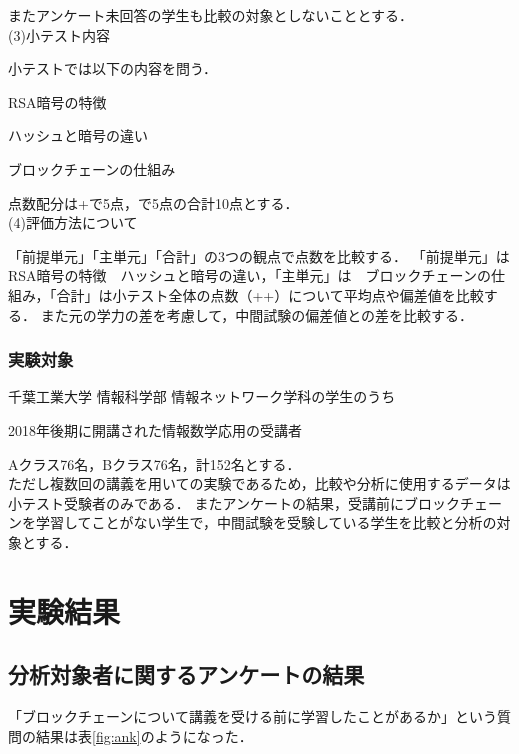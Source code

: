 \documentclass[a4j,12pt]{jsarticle}
\begin{document}
またアンケート未回答の学生も比較の対象としないこととする．
\\


(3)小テスト内容

小テストでは以下の内容を問う．

RSA暗号の特徴

ハッシュと暗号の違い

ブロックチェーンの仕組み

点数配分は+で5点，で5点の合計10点とする．\\


(4)評価方法について

「前提単元」「主単元」「合計」の3つの観点で点数を比較する．
「前提単元」は　RSA暗号の特徴　ハッシュと暗号の違い，「主単元」は　ブロックチェーンの仕組み，「合計」は小テスト全体の点数（++）について平均点や偏差値を比較する．
また元の学力の差を考慮して，中間試験の偏差値との差を比較する．

\subsubsection{実験対象}

千葉工業大学 情報科学部 情報ネットワーク学科の学生のうち

2018年後期に開講された情報数学応用の受講者

Aクラス76名，Bクラス76名，計152名とする．\\

ただし複数回の講義を用いての実験であるため，比較や分析に使用するデータは小テスト受験者のみである．
またアンケートの結果，受講前にブロックチェーンを学習してことがない学生で，中間試験を受験している学生を比較と分析の対象とする．





\newpage
\section{実験結果}
\subsection{分析対象者に関するアンケートの結果}
「ブロックチェーンについて講義を受ける前に学習したことがあるか」という質問の結果は表\ref{fig:ank}のようになった．\\
\end{document}
